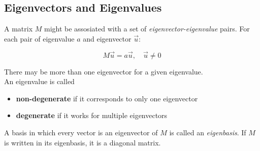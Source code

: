 \documentclass[a4paper]{article}
\begin{document}
\subsection{Eigenvectors and Eigenvalues}

A matrix \(M\) might be assosiated with a set of \textit{eigenvector-eigenvalue} pairs.
For each pair of eigenvalue \(a\) and eigenvector \(\vec{u}\):

\[
    M\vec{u}=a\vec{u},
    \quad\vec{u}\neq 0
\]

There may be more than one eigenvector for a given eigenvalue. \\
An eigenvalue is called
\begin{itemize}
    \item \textbf{non-degenerate} if it corresponds to only one eigenvector
    \item \textbf{degenerate} if it works for multiple eigenvectors
\end{itemize}

A basis in which every vector is an eigenvector of \(M\) is called an \textit{eigenbasis}.
If \(M\) is written in its eigenbasis, it is a diagonal matrix.


\pagebreak

\nocite{*} %

\printbibliography
\end{document}
